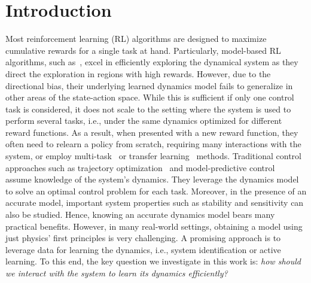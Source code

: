 \section{Introduction}
 Most reinforcement learning (RL) algorithms are designed to maximize cumulative rewards for a single task at hand. Particularly, model-based RL algorithms, such as~\citep{chua2018pets, kakade2020information, curi2020efficient}, excel in efficiently exploring the dynamical system as they direct the exploration in regions with high rewards. However, due to the directional bias, their underlying learned dynamics model fails to generalize in other areas of the state-action space. While this is sufficient if only one control task is considered, it does not scale to the setting where the system is used to perform several tasks, i.e., under the same dynamics optimized for different reward functions.
As a result, when presented with a new reward function, they often need to relearn a policy from scratch, requiring many interactions with the system, or employ multi-task~\citep{zhang2021survey} or transfer learning~\citep{weiss2016survey} methods. Traditional control approaches such as trajectory optimization~\citep{trajectorPlanningForRobots} and model-predictive control~\citep{mpc} assume knowledge of the system's dynamics. 
They leverage the dynamics model to solve an optimal control problem for each task. 
Moreover, in the presence of an accurate model, important system properties such as stability and sensitivity can also be studied. Hence, knowing an accurate dynamics model bears many practical benefits.
However, in many real-world settings, obtaining a model using just physics' first principles is very challenging. A promising approach is to leverage data for learning the dynamics, i.e., system identification or active learning.
To this end, the key question we investigate in this work is: \emph{how should we interact with the system to learn its dynamics efficiently?} 
    
